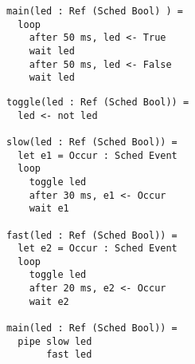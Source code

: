 \documentclass{article}
\begin{document}
\begin{lstlisting}
main(led : Ref (Sched Bool) ) =
  loop
    after 50 ms, led <- True
    wait led
    after 50 ms, led <- False
    wait led
\end{lstlisting}

\begin{lstlisting}
toggle(led : Ref (Sched Bool)) =
  led <- not led

slow(led : Ref (Sched Bool)) =
  let e1 = Occur : Sched Event
  loop
    toggle led
    after 30 ms, e1 <- Occur
    wait e1

fast(led : Ref (Sched Bool)) =
  let e2 = Occur : Sched Event
  loop
    toggle led
    after 20 ms, e2 <- Occur
    wait e2
    
main(led : Ref (Sched Bool)) =
  pipe slow led
       fast led
\end{lstlisting}
\end{document}
